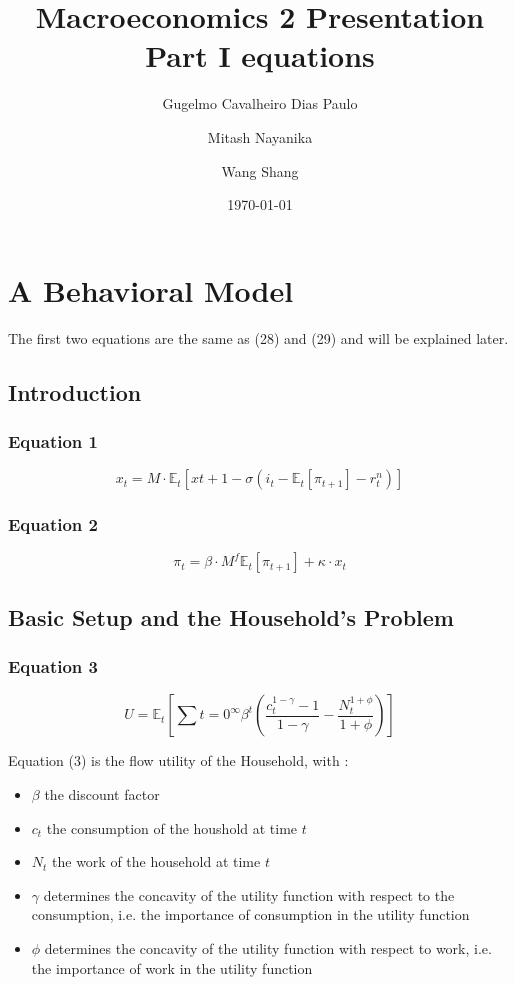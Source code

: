 \documentclass{article}
\title{Macroeconomics 2 Presentation \\ Part I equations}
\author{Gugelmo Cavalheiro Dias Paulo \\ \and Mitash Nayanika \\ \and Wang Shang}
\date{\today}
\begin{document}
\section{A Behavioral Model}
The first two equations are the same as (28) and (29) and will be explained later.

\subsection{Introduction}

\subsubsection*{Equation 1}
\begin{equation}\tag{1}
    x_{t}=M\cdot\mathbb{E}_{t}\left[ x{t+1} -\sigma (i_{t}-\mathbb{E}_{t}\left[\pi_{t+1}\right]-r^{n}_{t})\right]
\end{equation}

\subsubsection*{Equation 2}
\begin{equation}\tag{2}
    \pi_{t}=\beta\cdot M^{f} \mathbb{E}_{t}\left[\pi_{t+1}\right]+\kappa\cdot x_{t}
\end{equation}

\subsection{Basic Setup and the Household’s Problem}

\subsubsection*{Equation 3}
\begin{equation}\tag{3}
    U = \mathbb{E}_{t} \left[ \sum{t=0}^{\infty} \beta^{t}\left(\frac{c_{t}^{1-\gamma}-1}{1-\gamma} - \frac{N_{t}^{1+\phi}}{1+\phi}\right)\right]
\end{equation}

Equation (3) is the flow utility of the Household, with : 
\begin{itemize}
    \item $\beta$ the discount factor
    \item $c_{t}$ the consumption of the houshold at time $t$
    \item $N_{t}$ the work of the household at time $t$
    \item $\gamma$ determines the concavity of the utility function with respect to the consumption, i.e. the importance of consumption in the utility function
    \item $\phi$ determines the concavity of the utility function with respect to work, i.e. the importance of work in the utility function
\end{itemize}
\end{document}
